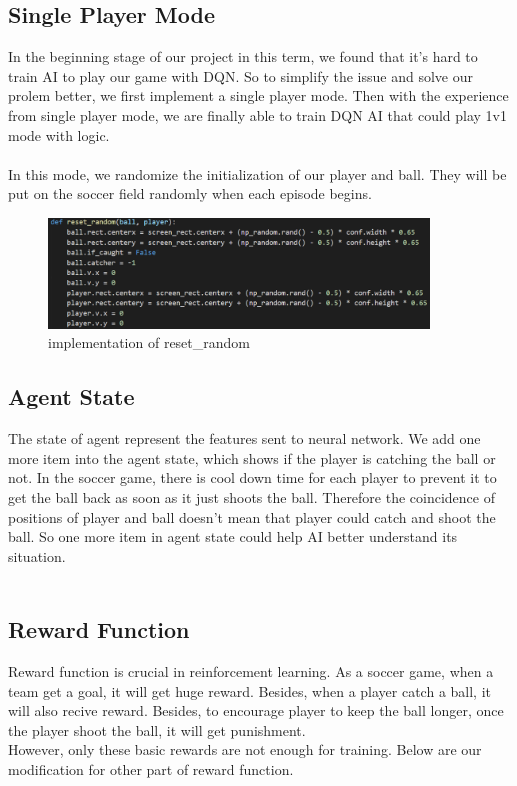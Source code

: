 \documentclass[14pt]{extarticle}
\begin{document}
\subsection{Single Player Mode}
In the beginning stage of our project in this term, we found that it's hard to train AI to play our game with DQN. So to simplify the issue and solve our prolem better, we first implement a single player mode. Then with the experience from single player mode, we are finally able to train DQN AI that could play 1v1 mode with logic.\\\\
In this mode, we randomize the initialization of our player and ball. They will be put on the soccer field randomly when each episode begins.
\begin{figure}[H]
	\begin{center}
		\includegraphics[width=0.9\textwidth]{reset_random}
		\caption{implementation of reset\_random}
	\end{center}
\end{figure}


\subsection{Agent State}
The state of agent represent the features sent to neural network. We add one more item into the agent state, which shows if the player is catching the ball or not. In the soccer game, there is cool down time for each player to prevent it to get the ball back as soon as it just shoots the ball. Therefore the coincidence of positions of player and ball doesn't mean that player could catch and shoot the ball. So one more item in agent state could help AI better understand its situation.\\\\


\subsection{Reward Function}
Reward function is crucial in reinforcement learning. As a soccer game, when a team get a goal, it will get huge reward. Besides, when a player catch a ball, it will also recive reward. Besides, to encourage player to keep the ball longer, once the player shoot the ball, it will get punishment.\\
However, only these basic rewards are not enough for training. Below are our modification for other part of reward function.
\end{document}
